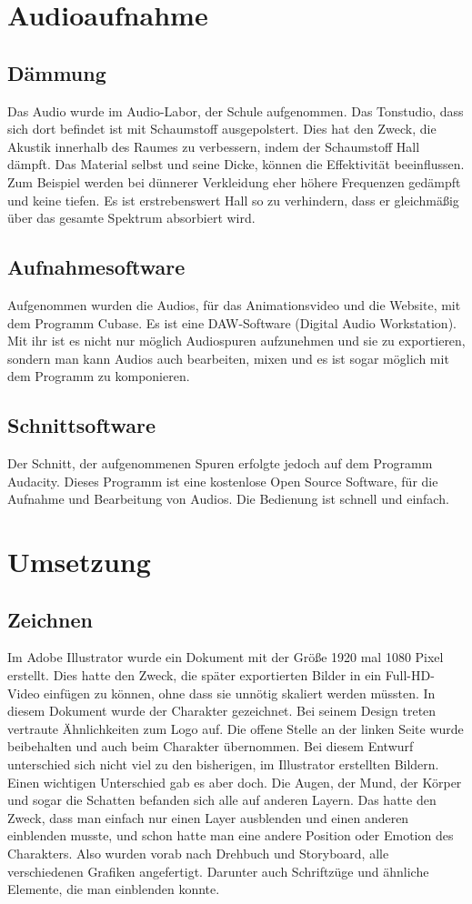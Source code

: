 \section{Audioaufnahme}
\subsection{Dämmung}
Das Audio wurde im Audio-Labor, der Schule aufgenommen. Das Tonstudio, dass sich dort befindet ist mit Schaumstoff ausgepolstert. Dies hat den Zweck, die Akustik innerhalb des Raumes zu verbessern, indem der Schaumstoff Hall dämpft. Das Material selbst und seine Dicke, können die Effektivität beeinflussen. Zum Beispiel werden bei dünnerer Verkleidung eher höhere Frequenzen gedämpft und keine tiefen. Es ist erstrebenswert Hall so zu verhindern, dass er gleichmäßig über das gesamte Spektrum absorbiert wird.\cite{damm} 
\subsection{Aufnahmesoftware}
Aufgenommen wurden die Audios, für das Animationsvideo und die Website, mit dem Programm Cubase. Es ist eine DAW-Software (Digital Audio Workstation). Mit ihr ist es nicht nur möglich Audiospuren aufzunehmen und sie zu exportieren, sondern man kann Audios auch bearbeiten, mixen und es ist sogar möglich mit dem Programm zu komponieren.\cite{cube}
\subsection{Schnittsoftware}
Der Schnitt, der aufgenommenen Spuren erfolgte jedoch auf dem Programm Audacity. Dieses Programm ist eine kostenlose Open Source Software, für die Aufnahme und Bearbeitung von Audios. Die Bedienung ist schnell und einfach.\cite{auda}
\section{Umsetzung}
\subsection{Zeichnen}
Im Adobe Illustrator wurde ein Dokument mit der Größe 1920 mal 1080 Pixel erstellt. Dies hatte den Zweck, die später exportierten Bilder in ein Full-HD-Video einfügen zu können, ohne dass sie unnötig skaliert werden müssten. In diesem Dokument wurde der Charakter gezeichnet. Bei seinem Design treten vertraute Ähnlichkeiten zum Logo auf. Die offene Stelle an der linken Seite wurde beibehalten und auch beim Charakter übernommen. Bei diesem Entwurf unterschied sich nicht viel zu den bisherigen, im Illustrator erstellten Bildern. Einen wichtigen Unterschied gab es aber doch. Die Augen, der Mund, der Körper und sogar die Schatten befanden sich alle auf anderen Layern. Das hatte den Zweck, dass man einfach nur einen Layer ausblenden und einen anderen einblenden musste, und schon hatte man eine andere Position oder Emotion des Charakters. Also wurden vorab nach Drehbuch und Storyboard, alle verschiedenen Grafiken angefertigt. Darunter auch Schriftzüge und ähnliche Elemente, die man einblenden konnte.

